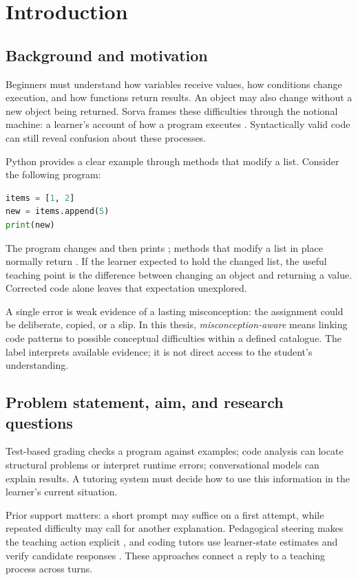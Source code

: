 \chapter{Introduction}
\label{ch:intro}

\section{Background and motivation}
Beginners must understand how variables receive values, how conditions change execution, and how functions return results. An object may also change without a new object being returned. Sorva frames these difficulties through the notional machine: a learner's account of how a program executes \citep{sorva2013}. Syntactically valid code can still reveal confusion about these processes.

Python provides a clear example through methods that modify a list. Consider the following program:
\begin{lstlisting}[language=Python]
items = [1, 2]
new = items.append(5)
print(new)
\end{lstlisting}
The program changes  and then prints ; methods that modify a list in place normally return  \citep{pythonlists}. If the learner expected  to hold the changed list, the useful teaching point is the difference between changing an object and returning a value. Corrected code alone leaves that expectation unexplored.

A single error is weak evidence of a lasting misconception: the assignment could be deliberate, copied, or a slip. In this thesis, \emph{misconception-aware} means linking code patterns to possible conceptual difficulties within a defined catalogue. The label interprets available evidence; it is not direct access to the student's understanding.

\section{Problem statement, aim, and research questions}
Test-based grading checks a program against examples; code analysis can locate structural problems or interpret runtime errors; conversational models can explain results. A tutoring system must decide how to use this information in the learner's current situation.

Prior support matters: a short prompt may suffice on a first attempt, while repeated difficulty may call for another explanation. Pedagogical steering makes the teaching action explicit \citep{stratl2025}, and coding tutors use learner-state estimates and verify candidate responses \citep{traver2025}. These approaches connect a reply to a teaching process across turns.

